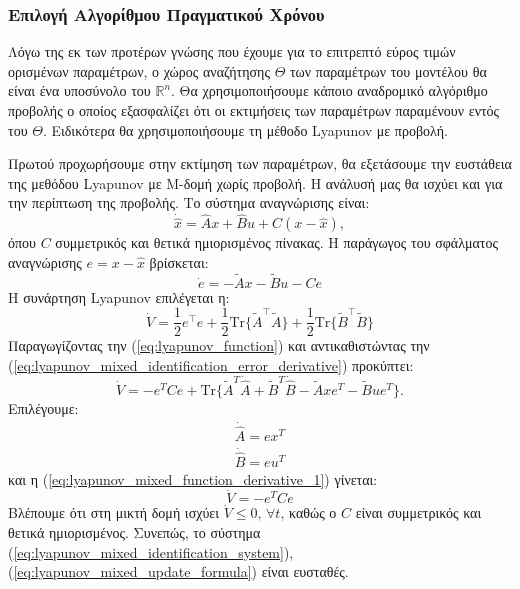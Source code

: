 \documentclass[a4paper,12pt]{article}
\begin{document}
\subsubsection*{Επιλογή Αλγορίθμου Πραγματικού Χρόνου}
Λόγω της εκ των προτέρων γνώσης που έχουμε για το επιτρεπτό εύρος τιμών ορισμένων παραμέτρων, 
ο χώρος αναζήτησης $\Theta$ των παραμέτρων του μοντέλου θα είναι ένα υποσύνολο του $\mathbb{R}^n$.
Θα χρησιμοποιήσουμε κάποιο αναδρομικό αλγόριθμο προβολής ο οποίος εξασφαλίζει ότι οι εκτιμήσεις των
παραμέτρων παραμένουν εντός του $\Theta$. Ειδικότερα θα χρησιμοποιήσουμε τη μέθοδο 
Lyapunov με προβολή.

Πρωτού προχωρήσουμε στην εκτίμηση των παραμέτρων, θα εξετάσουμε την ευστάθεια της μεθόδου 
Lyapunov με Μ-δομή χωρίς προβολή. Η ανάλυσή μας
θα ισχύει και για την περίπτωση της προβολής.
Το σύστημα αναγνώρισης είναι:
\begin{equation}
    \dot{\hat{x}} = \hat{A}x + \hat{B} u + C(x - \hat{x}),
    \label{eq:lyapunov_mixed_identification_system}
\end{equation}
όπου $C$ συμμετρικός και θετικά ημιορισμένος πίνακας. Η παράγωγος του σφάλματος αναγνώρισης $e = x - \hat{x}$ 
βρίσκεται:
\begin{equation}
    \dot{e} = -\tilde{A}x - \tilde{B}u - Ce
    \label{eq:lyapunov_mixed_identification_error_derivative}
\end{equation}
Η συνάρτηση Lyapunov επιλέγεται η:
\begin{equation}
    \dot{V} = \frac{1}{2}e^{\top}e + \frac{1}{2}\mathrm{Tr}\{\tilde{A}^{\top}\tilde{A}\}
    + \frac{1}{2}\mathrm{Tr}\{\tilde{B}^{\top}\tilde{B}\}
    \label{eq:lyapunov_function}
\end{equation}
Παραγωγίζοντας την (\ref{eq:lyapunov_function}) και αντικαθιστώντας
την (\ref{eq:lyapunov_mixed_identification_error_derivative}) προκύπτει:
\begin{equation}
    \dot{V} = -e^TCe + \mathrm{Tr}\{\tilde{A}^T\dot{\hat{A}} + \tilde{B}^T\dot{\hat{B}} - 
    \tilde{A}xe^T - \tilde{B}ue^T\}.
    \label{eq:lyapunov_mixed_function_derivative_1}  
\end{equation}
Επιλέγουμε:
\begin{equation}
    \begin{aligned}
        \dot{\hat{A}} = ex^T \\ 
        \dot{\hat{B}} = eu^T
    \end{aligned}
    \label{eq:lyapunov_mixed_update_formula}
\end{equation}
και η (\ref{eq:lyapunov_mixed_function_derivative_1}) γίνεται:
\begin{equation}
    \dot{V} = -e^TCe
    \label{eq:lyapunov_mixed_function_derivative_2}
\end{equation}
Βλέπουμε ότι στη μικτή δομή ισχύει $\dot{V} \leq 0, \, \forall t$, καθώς ο $C$ είναι συμμετρικός και θετικά
ημιορισμένος. Συνεπώς, το σύστημα (\ref{eq:lyapunov_mixed_identification_system}), 
(\ref{eq:lyapunov_mixed_update_formula}) είναι ευσταθές.
\end{document}
